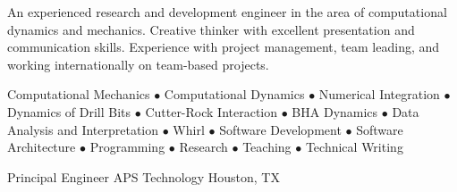 \documentclass{leresume}
\begin{document}
	\thispagestyle{lefooterhorizontalline}
	\makeresumeheaderC
	
	An experienced research and development engineer in the area of computational dynamics and mechanics. Creative thinker with excellent presentation and communication skills. Experience with project management, team leading, and working internationally on team-based projects.

	Computational Mechanics $\bullet$ Computational Dynamics $\bullet$ Numerical Integration $\bullet$ Dynamics of Drill Bits $\bullet$ Cutter-Rock Interaction $\bullet$ BHA Dynamics $\bullet$ Data Analysis and Interpretation $\bullet$ Whirl $\bullet$ Software Development $\bullet$ Software Architecture $\bullet$ Programming $\bullet$ Research $\bullet$ Teaching $\bullet$ Technical Writing


%			
				
            {Principal Engineer}
            {APS Technology}
			{Houston, TX}
			
\end{document}
